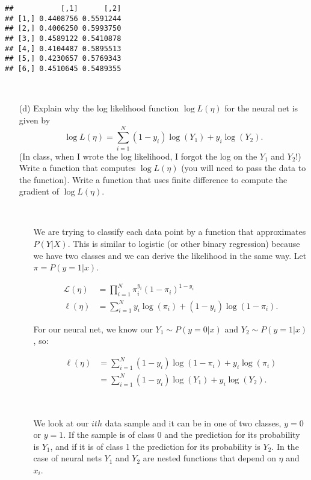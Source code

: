 \documentclass[]{article}
\begin{document}
\begin{verbatim}
##           [,1]      [,2]
## [1,] 0.4408756 0.5591244
## [2,] 0.4006250 0.5993750
## [3,] 0.4589122 0.5410878
## [4,] 0.4104487 0.5895513
## [5,] 0.4230657 0.5769343
## [6,] 0.4510645 0.5489355
\end{verbatim}

~

\begin{itemize} \item[(d)] Explain why the log likelihood function $\log L(\eta)$ for the neural net  is given by
\begin{equation}
\log L(\eta) = \sum_{i=1}^N (1-y_i) \log(Y_1) + y_i \log(Y_2).
\end{equation}
(In class, when I wrote the log likelihood, I forgot the log on the $Y_1$ and $Y_2$!)   Write a function that computes $\log L(\eta)$ (you will need to pass the data to the function).  Write a function that uses finite difference to compute the gradient of $\log L(\eta)$.
  
 
 \ 
 
 \begin{itemize} \item[ ]  We are trying to classify each data point by a function that approximates $P(Y|X)$. This is similar to logistic (or other binary regression) because we have two classes and we can derive the likelihood in the same way. Let $\pi = P(y=1|x)$.
 
 \begin{align*}
 \mathcal{L}(\eta) &= \prod_{i=1}^N \pi_i^{y_i} (1-\pi_i)^{1-y_i} \\
 \ell(\eta) &= \sum_{i=1}^N y_i \log(\pi_i) + (1-y_i) \log(1-\pi_i).
 \end{align*}
 
For our neural net, we know our $Y_1 \sim P(y=0|x)$ and $Y_2 \sim P(y=1|x)$, so:

 \begin{align*}
 \ell(\eta) &= \sum_{i=1}^N  (1-y_i) \log(1-\pi_i) + y_i \log(\pi_i) \\
 &= \sum_{i=1}^N    (1-y_i) \log(Y_1) + y_i \log(Y_2).
 \end{align*}
 
\ 


We look at our $ith$ data sample and it can be in one of two classes, $y=0$ or $y=1$. If the sample is of class 0 and the prediction for its probability is $Y_1$, and if it is of class 1 the prediction for its probability is $Y_2$. In the case of neural nets $Y_1$ and $Y_2$ are nested functions that depend on $\eta$ and $x_i$.

\ 

\end{itemize} 
 \end{itemize}
\end{document}
